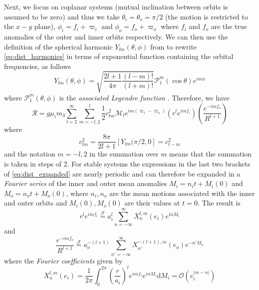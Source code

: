 Next, we focus on coplanar systems
(mutual inclination between orbits is assumed to be zero) and thus we take
$\theta_i=\theta_o=\pi/2$ (the motion is restricted to the $x-y$ plane), 
$\phi_i=f_i+\varpi_i$ and $\phi_o=f_o+\varpi_o$ where $f_i$ and $f_o$ are
the true anomalies of the outer and inner orbits respectively.
 We can then use the definition of the spherical harmonic $Y_{lm}(\theta, \phi)$ 
from \cite{jackson} to rewrite \cref{eq:dist_harmonics} in terms of exponential
function containing the orbital frequencies, as follows
\begin{equation}
    Y_{lm}(\theta,\phi)=\sqrt{ \frac{2l+1}{4\pi} \frac{(l-m)!}{(l+m)!} }\mathcal{P}_1^m(
    \cos\theta)e^{im\phi}
    \label{eq:sph_harmonics}
\end{equation}
where $\mathcal{P}_1^m(\theta, \phi)$ is the \emph{associated Legendre function}
\citep{jackson}. Therefore, we have
\begin{equation}
    \mathcal{R}=g\mu_im_3\sum^\infty_{l=2}\sum^l_{m=-l,2} \frac{1}{2} c_{lm}^2\mathcal{M}_l
    e^{im(\varpi_i-\varpi_o)}\left(r^le^{imf_i}\right)\left( \frac{e^{-imf_o}}{R^{l+1}} 
    \right)
    \label{eq:dist_expanded}
\end{equation}
where
\begin{equation}
    c^2_{lm}= \frac{8\pi}{2l+1} \left[Y_{lm}(\pi/2,0\right]=c^2_{l-m}
\end{equation}
and the notation $m=-l, 2$ in the summation over $m$ means that the summation is taken
in steps of 2. For stable systems the expressions in the last two brackets of
\cref{eq:dist_expanded} are nearly periodic and can therefore be expanded in a 
\emph{Fourier series} of the inner and outer mean anomalies $M_i=n_it+M_i(0)$ and
$M_o=n_ot+M_o(0)$, where $n_i,n_o$ are the mean motions associated with the inner
and outer orbits and $M_i(0),M_o(0)$ are their values at $t=0$.  The result is
\begin{equation}
    r^le^{imf_i}\stackrel{\mathcal{F}}{=}a_i^l\sum^\infty_{n=-\infty}X^{l,m}_n(e_i)e^{inM_i}
    \label{eq:expansion_1}
\end{equation}
and
\begin{equation}
    \frac{r^{-imf_o}}{R^{l+1}} \stackrel{\mathcal{F}}{=}a_o^{-(l+1)}\sum^\infty_{n'=-\infty}
    X^{-(l+1),m}_{n'}(e_o)e^{-n'M_o}
    \label{eq:expansion_2}
\end{equation}
where the \emph{Fourier coefficients} given by
\begin{equation}
    X^{l,m}_n(e_i)= \frac{1}{2\pi} \int^{2\pi}_0 \left(\frac{r}{a_i}\right)^l
    e^{imf_i}e^{inM_i}\mathrm{d}M_i=\mathcal{O}(e_i^{\lvert m-n\rvert})
\end{equation}
